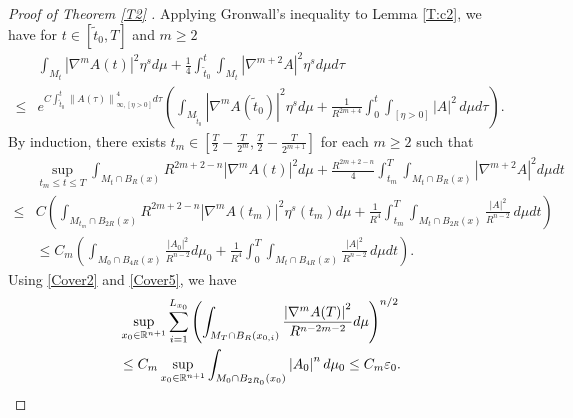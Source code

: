 \documentclass{amsart}
\theoremstyle{definition}
\def\R{{\Bbb R}}
\numberwithin{equation}{section}
\begin{document}
\begin{proof}[Proof of Theorem   \ref{T2} ]
Applying Gronwall's inequality to Lemma \ref{T:c2}, we have for $t\in [\tilde t_0,T]$ and  $m\geq 2$
\begin{align}\label{Cover4}
   & \int_{M_t}  \left| \nabla^{m} A(t) \right|^{2} \eta^{s} d\mu +\frac{1}{4} \int_{\tilde t_0}^t \int_{M_t}  \left| \nabla^{m+2} A \right|^{2}  \eta^{s}
   d\mu  d\tau  \\
 \leq & e^{C \int_{\tilde t_0}^t  \left\| A(\tau) \right\|^{4}_{\infty, \left[  \eta >0\right]}  d\tau } \left(  \int_{M_{\tilde t_0}} \left|
 \nabla^{m} A(\tilde t_0) \right|^{2}
  \eta^{s} d\mu +\frac 1{R^{2m+4}}\int_0^t \int_{\left[  \eta>0 \right]}  {|A|^2} \,d\mu d\tau\right) \mbox{.}\nonumber
\end{align}
By induction, there exists $t_m\in [ \frac T2-\frac T{2^m}, \frac T2-\frac T{2^{m+1}}]$  for each $m\geq 2$ such that
\begin{align}\label{Cover5}
   & \sup_{t_m\leq t\leq T}\int_{M_{t}\cap B_{R}(x)}  R^{2m+2-n} \left| \nabla^{m} A(t) \right|^{2}  d\mu +\frac{ R^{2m+2-n}}{4} \int_{t_m}^T \int_{ M_t\cap B_{R}(x)}  \left| \nabla^{m+2} A \right|^{2}
   d\mu  dt  \\
 \leq & C\left(  \int_{M_{t_m}\cap B_{2R}(x)}R^{2m+2-n} \left|
 \nabla^{m} A(t_m) \right|^{2} \eta^{s} (t_m) d\mu +\frac 1{R^4}\int_{t_m}^T \int_{M_t\cap B_{2R}(x)} \frac {|A|^2}{R^{n-2}} \,d\mu dt\right)\nonumber\\
  &\leq   C_m\left(  \int_{M_0\cap B_{4R}(x)} \frac {\left| A_0 \right|^{2}}{R^{n-2}} d\mu_0 +\frac 1{R^4}\int_{0}^T \int_{M_t\cap B_{4R}(x)} \frac {|A|^2}{R^{n-2}} \,d\mu dt\right) \mbox{.}\nonumber
\end{align}
Using \eqref{Cover2} and \eqref{Cover5},   we have
\begin{align}\label {5E2}
 &  \sup_{x_0\in\R^{n+1}} \sum_{i=1}^{L_{x_0}}\left ( \int_{M_T\cap B_{R}(x_{0,i})}  \frac { \left|{\nabla^{m} A(T)} \right|^{2}}  { R^{n-2m-2}} d\mu\right )^{n/2}
  \\
&\leq C_m  \sup_{x_0\in\R^{n+1}} \int_{M_0\cap B_{2R_0}({x_0})} \left| A_{0} \right|^{n} d\mu_{0}\leq C_m \varepsilon_0. \nonumber
\end{align}


\end{proof}
\end{document}
